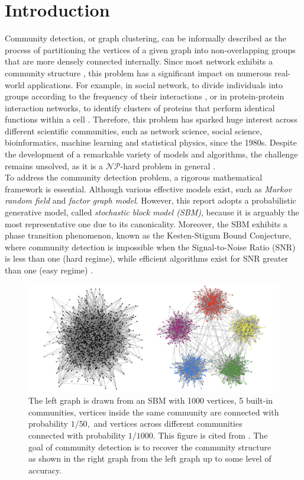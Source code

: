 \chapter{Introduction}
Community detection, or graph clustering,  can be informally described as the process of partitioning the vertices of a given graph into non-overlapping groups that are more densely connected internally. Since most network exhibits a community structure \cite{comm_dete_in_graphs}, this problem has a significant impact on numerous real-world applications. For example, in social network, to divide individuals into groups according to the frequency of their interactions \cite{social}, or in protein-protein interaction networks, to identify clusters of proteins that perform identical functions within a cell \cite{bio}. Therefore, this problem has sparked huge interest across different scientific communities, such as network science, social science, bioinformatics, machine learning and statistical physics, since the 1980s. Despite the development of a remarkable variety of models and algorithms, the challenge remains unsolved, as it is a $\mathcal{NP}$-hard problem in general \cite{np-hard}.\\

To address the community detection problem, a rigorous mathematical framework is essential. Although various effective models exist, such as \textit{Markov random field} and \textit{factor graph model}. However, this report adopts a probabilistic generative model, called \textit{stochastic block model (SBM)}, because it is arguably the most representative one due to its canonicality. Moreover, the SBM exhibits a phase transition phenomenon, known as the Kesten-Stigum Bound Conjecture, where community detection is impossible when the Signal-to-Noise Ratio (SNR) is less than one (hard regime), while efficient algorithms exist for SNR greater than one (easy regime) \cite{Emmanuel2023} \cite{deeplearning}.\\

\begin{figure}[h]
    \centering
    \includegraphics[width=1\linewidth]{Figures/community.jpg}
    \caption[Community Structure]{The left graph is drawn from an SBM with 1000 vertices, 5 built-in communities, vertices inside the same community are connected with probability $1/50,$ and vertices across different communities connected with probability $1/1000.$ This figure is cited from \cite{TheConjecture}. The goal of community detection is to recover the community structure as shown in the right graph from the left graph up to some level of accuracy.}
    \label{fig:community}
\end{figure}

